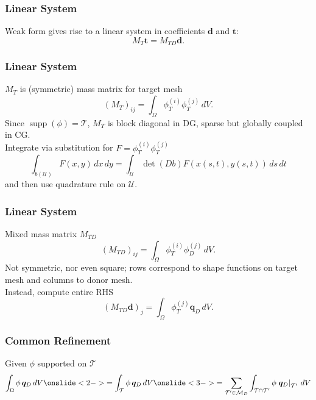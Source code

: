 \documentclass{beamer}
\newcommand{\utri}{\mathcal{U}}
\begin{document}
\begin{frame}
\frametitle{Linear System}
Weak form gives rise to a linear system in coefficients
\(\bm{d}\) and \(\bm{t}\):
\pause
\begin{equation*}
M_T \bm{t} = M_{TD} \bm{d}.
\end{equation*}
\end{frame}

\begin{frame}
\frametitle{Linear System}
\(M_T\) is (symmetric) mass matrix for target mesh
\begin{equation*}
\left(M_T\right)_{ij} = \int_{\Omega} \phi_T^{(i)} \phi_T^{(j)} \, dV.
\end{equation*}
\pause
Since \(\operatorname{supp}(\phi) = \mathcal{T}\),
\(M_T\) is block diagonal in DG, sparse but globally coupled in CG. \\
\pause
Integrate via substitution for \(F = \phi_T^{(i)} \phi_T^{(j)}\)
\begin{equation*}
\int_{b\left(\utri\right)} F(x, y) \, dx \, dy =
  \int_{\utri} \det(Db) F\left(x(s, t), y(s, t)\right) \, ds \, dt
\end{equation*}
and then use quadrature rule on \(\utri\).
\end{frame}

\begin{frame}
\frametitle{Linear System}
Mixed mass matrix \(M_{TD}\)
\begin{equation*}
\left(M_{TD}\right)_{ij} = \int_{\Omega} \phi_T^{(i)} \phi_D^{(j)} \, dV.
\end{equation*}
\pause
Not symmetric, nor even square; rows correspond to shape functions on target
mesh and columns to donor mesh. \\
\pause
Instead, compute entire RHS
\begin{equation*}
\left(M_{TD} \bm{d}\right)_j = \int_{\Omega} \phi_T^{(j)} \bm{q}_D \, dV.
\end{equation*}
\end{frame}

\begin{frame}
\frametitle{Common Refinement}
Given \(\phi\) supported on \(\mathcal{T}\)
\begin{equation*}
\int_{\Omega} \phi \, \bm{q}_D \, dV
  \onslide<2->{= \int_{\mathcal{T}} \phi \, \bm{q}_D \, dV}
  \onslide<3->{= \sum_{\mathcal{T}' \in \mathcal{M}_D}
    \int_{\mathcal{T} \cap \mathcal{T}'} \phi
    \left.\bm{q}_D\right|_{\mathcal{T}'} \, dV}
\end{equation*}
\end{frame}
\end{document}
